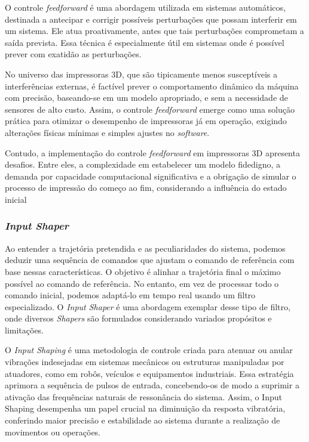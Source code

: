 O controle \textit{feedforward} é uma abordagem utilizada em sistemas automáticos, destinada a antecipar e corrigir possíveis perturbações que possam interferir em um sistema. Ele atua proativamente, antes que tais perturbações comprometam a saída prevista. Essa técnica é especialmente útil em sistemas onde é possível prever com exatidão as perturbações.

No universo das impressoras 3D, que são tipicamente menos susceptíveis a interferências externas, é factível prever o comportamento dinâmico da máquina com precisão, baseando-se em um modelo apropriado, e sem a necessidade de sensores de alto custo. Assim, o controle \textit{feedforward} emerge como uma solução prática para otimizar o desempenho de impressoras já em operação, exigindo alterações físicas mínimas e simples ajustes no \textit{software}.

Contudo, a implementação do controle \textit{feedforward} em impressoras 3D apresenta desafios. Entre eles, a complexidade em estabelecer um modelo fidedigno, a demanda por capacidade computacional significativa e a obrigação de simular o processo de impressão do começo ao fim, considerando a influência do estado inicial \cite{ramani20,duan18}

\subsubsection{\textit{Input Shaper}}
Ao entender a trajetória pretendida e as peculiaridades do sistema, podemos deduzir uma sequência de comandos que ajustam o comando de referência com base nessas características. O objetivo é alinhar a trajetória final o máximo possível ao comando de referência. No entanto, em vez de processar todo o comando inicial, podemos adaptá-lo em tempo real usando um filtro especializado. O \textit{Input Shaper} é uma abordagem exemplar desse tipo de filtro, onde diversos \textit{Shapers} são formulados considerando variados propósitos e limitações.

O \textit{Input Shaping} é uma metodologia de controle criada para atenuar ou anular vibrações indesejadas em sistemas mecânicos ou estruturas manipuladas por atuadores, como em robôs, veículos e equipamentos industriais. Essa estratégia aprimora a sequência de pulsos de entrada, concebendo-os de modo a suprimir a ativação das frequências naturais de ressonância do sistema. Assim, o Input Shaping desempenha um papel crucial na diminuição da resposta vibratória, conferindo maior precisão e estabilidade ao sistema durante a realização de movimentos ou operações.

